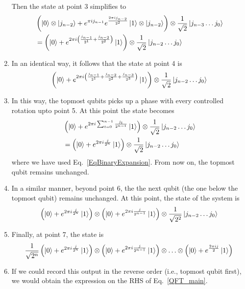 \documentclass[12pt,oneside]{book}
\begin{document}
\begin{enumerate}
    Then the state at point 3 simplifies to
    \begin{align*}
       &{} \left(\ket{0}\otimes\ket{j_{n-2}}+e^{\pi i j_{n-1}}e^{\frac{2\pi i j_{n-2}}{2^2}}\ket{1}\otimes\ket{j_{n-2}}\right) \otimes \frac{1}{\sqrt{2}}\ket{j_{n-3}\hdots j_0}\\
       &{} = \left(\ket{0}+e^{2\pi i \left(\frac{j_{n-1}}{2^1}+\frac{j_{n-2}}{2^2}\right)}\ket{1}\right) \otimes \frac{1}{\sqrt{2}}\ket{j_{n-2}\hdots j_0}\\
    \end{align*}
    \item In an identical way, it follows that the state at point 4 is
    \begin{align*}
         \left(\ket{0}+e^{2\pi i \left(\frac{j_{n-1}}{2^1}+\frac{j_{n-2}}{2^2}+\frac{j_{n-3}}{2^3}\right)}\ket{1}\right) \otimes \frac{1}{\sqrt{2}}\ket{j_{n-2}\hdots j_0}
    \end{align*}
    \item In this way, the topmost qubits picks up a phase with every controlled rotation upto point 5. At this point the state becomes
    \begin{align*}
        &{}\left(\ket{0}+e^{2\pi i \sum_{t=0}^{n-1}\frac{j_t}{2^{n-t}}}\ket{1}\right) \otimes \frac{1}{\sqrt{2}}\ket{j_{n-2}\hdots j_0}\\
        &{}=\left(\ket{0}+e^{2\pi i\frac{j}{2^n}}\ket{1}\right) \otimes \frac{1}{\sqrt{2}}\ket{j_{n-2}\hdots j_0}
    \end{align*}
    where we have used Eq.~\ref{EqBinaryExpansion}.
    From now on, the topmost qubit remains unchanged.
    \item In a similar manner, beyond point 6, the the next qubit (the one below the topmost qubit) remains unchanged. At this point, the state of the system is
    \begin{align*}
        \left(\ket{0}+e^{2\pi i\frac{j}{2^n}}\ket{1}\right) \otimes \left(\ket{0}+e^{2\pi i\frac{j}{2^{n-1}}}\ket{1}\right) \otimes \frac{1}{\sqrt{2^2}}\ket{j_{n-2}\hdots j_0}
    \end{align*}
\item Finally, at point 7, the state is
\begin{align*}
    \frac{1}{\sqrt{2^n}} \left(\ket{0}+e^{2\pi i\frac{j}{2^n}}\ket{1}\right) \otimes \left(\ket{0}+e^{2\pi i\frac{j}{2^{n-1}}}\ket{1}\right) \otimes \hdots \otimes \left(\ket{0} + e^{\frac{2\pi ij}{2}}\ket{1}\right)
\end{align*}
\item If we could record this output in the reverse order (i.e., topmost qubit first), we would obtain the expression on the RHS of Eq.~\ref{QFT_main}.
\end{enumerate}
\end{document}
